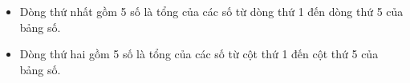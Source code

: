 \begin{itemize}
	\item Dòng thứ nhất gồm 5 số là tổng của các số từ dòng thứ 1 đến dòng thứ 5 của bảng số.
	\item Dòng thứ hai gồm 5 số là tổng của các số từ cột thứ 1 đến cột thứ 5 của bảng số.
\end{itemize}